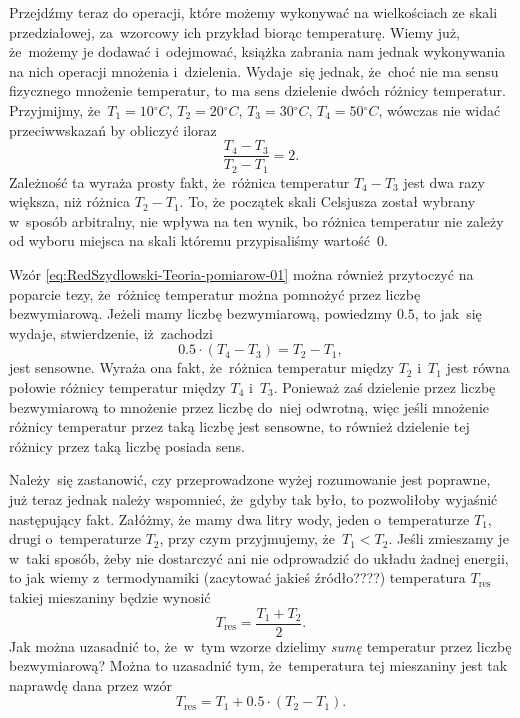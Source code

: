 \documentclass[a4paper,11pt]{article}
\begin{document}
Przejdźmy teraz do operacji, które możemy wykonywać na wielkościach ze skali
przedziałowej, za~wzorcowy ich przykład biorąc temperaturę. Wiemy już,
że~możemy je dodawać i~odejmować, książka zabrania nam jednak wykonywania na
nich operacji mnożenia i~dzielenia. Wydaje~się jednak, że~choć nie ma sensu
fizycznego mnożenie temperatur, to ma sens dzielenie dwóch różnicy
temperatur. Przyjmijmy,
że~$T_{ 1 } = 10 {}^{ \circ }\si{C}$, $T_{ 2 } = 20 {}^{ \circ }\si{C}$,
$T_{ 3 } = 30 {}^{ \circ }\si{C}$, $T_{ 4 } = 50 {}^{ \circ }\si{C}$, wówczas nie widać
przeciwwskazań by obliczyć iloraz
\begin{equation}
  \label{eq:RedSzydlowski-Teoria-pomiarow-01}
  \frac{ T_{ 4 } - T_{ 3 } }{ T_{ 2 } - T_{ 1 } } = 2.
\end{equation}
Zależność ta wyraża prosty fakt, że~różnica temperatur $T_{ 4 } - T_{ 3 }$
jest dwa razy większa, niż różnica $T_{ 2 } - T_{ 1 }$. To, że początek skali
Celsjusza został wybrany w~sposób arbitralny, nie wpływa na ten wynik, bo
różnica temperatur nie zależy od wyboru miejsca na skali któremu
przypisaliśmy wartość~$0$.

Wzór \eqref{eq:RedSzydlowski-Teoria-pomiarow-01} można również przytoczyć na
poparcie tezy, że~różnicę temperatur można pomnożyć przez liczbę
bezwymiarową. Jeżeli mamy liczbę bezwymiarową, powiedzmy $0.5$, to
jak~się wydaje, stwierdzenie, iż~zachodzi
\begin{equation}
  \label{eq:RedSzydlowski-Teoria-pomiarow-02}
  0.5 \cdot ( T_{ 4 } - T_{ 3 } ) = T_{ 2 } - T_{ 1 },
\end{equation}
jest sensowne. Wyraża ona fakt, że~różnica temperatur między $T_{ 2 }$
i~$T_{ 1 }$ jest równa połowie różnicy temperatur między $T_{ 4 }$ i~$T_{ 3 }$.
Ponieważ zaś dzielenie przez liczbę bezwymiarową to mnożenie przez liczbę
do~niej odwrotną, więc jeśli mnożenie różnicy temperatur przez taką liczbę
jest sensowne, to również dzielenie tej różnicy przez taką liczbę posiada
sens.

Należy~się zastanowić, czy przeprowadzone wyżej rozumowanie jest poprawne,
już teraz jednak należy wspomnieć, że~gdyby tak było, to pozwoliłoby wyjaśnić
następujący fakt. Załóżmy, że mamy dwa litry wody, jeden o~temperaturze
$T_{ 1 }$, drugi o~temperaturze $T_{ 2 }$, przy czym przyjmujemy,
że~$T_{ 1 } < T_{ 2 }$. Jeśli zmieszamy je w~taki sposób, żeby nie dostarczyć
ani nie odprowadzić do układu żadnej energii, to jak wiemy z~termodynamiki
(zacytować jakieś źródło????) temperatura $T_{ \textrm{res} }$ takiej
mieszaniny będzie wynosić
\begin{equation}
  \label{eq:RedSzydlowski-Teoria-pomiarow-03}
  T_{ \textrm{res} } = \frac{ T_{ 1 } + T_{ 2 } }{ 2 }.
\end{equation}
Jak można uzasadnić to, że~w~tym wzorze dzielimy \textit{sumę} temperatur
przez liczbę bezwymiarową? Można to uzasadnić tym, że~temperatura tej
mieszaniny jest tak naprawdę dana przez wzór
\begin{equation}
  \label{eq:RedSzydlowski-Teoria-pomiarow-04}
  T_{ \textrm{res} } = T_{ 1 } + 0.5 \cdot ( T_{ 2 } - T_{ 1 } ).
\end{equation}
\end{document}
